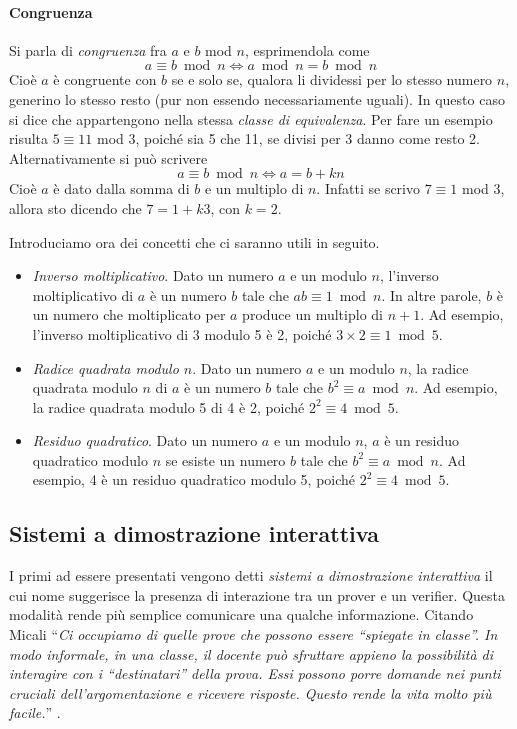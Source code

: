 \documentclass{article}
\theoremstyle{definition}
\begin{document}
\paragraph{Congruenza}
Si parla di \emph{congruenza} fra $a$ e $b$ mod $n$, esprimendola come
\begin{equation*}
    a \equiv b \bmod n \Leftrightarrow a \bmod n = b \bmod n
\end{equation*}
Cioè $a$ è congruente con $b$ se e solo se, qualora li dividessi per lo stesso numero $n$, generino lo stesso resto (pur non essendo necessariamente uguali). In questo caso si dice che appartengono nella stessa \emph{classe di equivalenza}.
Per fare un esempio risulta $5 \equiv 11$ mod $3$, poiché sia 5 che 11, se divisi per 3 danno come resto 2.
Alternativamente si può scrivere 
\begin{equation*}
    a \equiv b \bmod n \Leftrightarrow a = b + kn
\end{equation*}
Cioè $a$ è dato dalla somma di $b$ e un multiplo di $n$. Infatti se scrivo $7 \equiv 1$ mod $3$, allora sto dicendo che $7 = 1 + k3$, con $k = 2$.

Introduciamo ora dei concetti che ci saranno utili in seguito.
\begin{itemize}
    \item \emph{Inverso moltiplicativo}. Dato un numero $a$ e un modulo $n$, l'inverso moltiplicativo di $a$ è un numero $b$ tale che $ab \equiv 1 \bmod n$. In altre parole, $b$ è un numero che moltiplicato per $a$ produce un multiplo di $n+1$. Ad esempio, l'inverso moltiplicativo di 3 modulo 5 è 2, poiché $3 \times 2 \equiv 1 \bmod 5$.
    \item \emph{Radice quadrata modulo $n$}. Dato un numero $a$ e un modulo $n$, la radice quadrata modulo $n$ di $a$ è un numero $b$ tale che $b^2 \equiv a \bmod n$. Ad esempio, la radice quadrata modulo 5 di 4 è 2, poiché $2^2 \equiv 4 \bmod 5$.
    \item \emph{Residuo quadratico}. Dato un numero $a$ e un modulo $n$, $a$ è un residuo quadratico modulo $n$ se esiste un numero $b$ tale che $b^2 \equiv a \bmod n$. Ad esempio, 4 è un residuo quadratico modulo 5, poiché $2^2 \equiv 4 \bmod 5$.
\end{itemize}



\subsection{Sistemi a dimostrazione interattiva}
I primi ad essere presentati vengono detti \emph{sistemi a dimostrazione interattiva} il cui nome suggerisce la presenza di interazione tra un prover e un verifier. Questa modalità rende più semplice comunicare una qualche informazione. Citando Micali ``\emph{Ci occupiamo di quelle prove che possono essere ``spiegate in classe''. In modo informale, in una classe, il docente può sfruttare appieno la possibilità di interagire con i ``destinatari'' della prova. Essi possono porre domande nei punti cruciali dell'argomentazione e ricevere risposte. Questo rende la vita molto più facile.}'' \cite{micali}.
\end{document}
